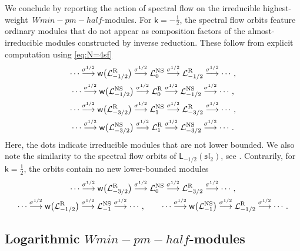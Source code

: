 \documentclass[10pt,a4paper]{amsart}
\numberwithin{equation}{section}
\newcommand{\kk}{\mathsf{k}} %
\newcommand{\NS}{\textnormal{NS}}
\newcommand{\R}{\textnormal{R}}
\DeclarePairedDelimiter{\brac}{\lparen}{\rparen} %
\newcommand{\lra}{\longrightarrow}
\newcommand{\alg}[1]{\mathfrak{#1}} %
\newcommand{\VOA}[1]{\mathsf{#1}} %
\newcommand{\Mod}[1]{\mathcal{#1}} %
\newcommand{\SLA}[2]{\alg{#1}_{#2}} %
\newcommand{\sltwo}{\SLA{sl}{2}}
\newcommand{\saff}[2]{\VOA{L}_{#1}(#2)} %
\newcommand{\ssl}[1][\kk]{\saff{#1}{\sltwo}} %
\newcommand{\swalg}[2]{\VOA{W}_{#1}^{\mathrm{#2}}} %
\newcommand{\smin}[1][\kk]{\swalg{#1}{min}} %
\newcommand{\sminpmhalf}{\smin[\pm 1/2]}
\newcommand{\nconjsymb}{\mathsf{w}} %
\newcommand{\nconj}{\nconjsymb \brac}
\newcommand{\nsfsymb}[1]{\sigma^{#1}} %
\newcommand{\nnsihw}[1]{\Mod{L}^{\NS}_{#1}} %
\newcommand{\nrihw}[1]{\Mod{L}^{\R}_{#1}}
\newcommand{\hw}{highest-weight}
\def\boldsymbol#1{#1}
\def\smash#1{#1}
\def\sminpmhalf{Wmin-pm-half}
\begin{document}
We conclude by reporting the action of spectral flow on the irreducible \hw\ \smash{$\sminpmhalf$}-modules.
For $\kk=-\frac{1}{2}$, the spectral flow orbits feature ordinary modules that do not appear as composition factors of the almost-irreducible modules constructed by inverse reduction.
These follow from explicit computation using \eqref{eq:N=4sf}
\begin{gather*}
\cdots \overset{\nsfsymb{1/2}}{\lra} \nconj[\big]{\nrihw{-1/2}} \overset{\nsfsymb{1/2}}{\lra} \nnsihw{0} \overset{\nsfsymb{1/2}}{\lra} \nrihw{-1/2} \overset{\nsfsymb{1/2}}{\lra} \cdots, \\
		\cdots \overset{\nsfsymb{1/2}}{\lra} \nconj[\big]{\nnsihw{-1/2}} \overset{\nsfsymb{1/2}}{\lra} \nrihw{0} \overset{\nsfsymb{1/2}}{\lra} \nnsihw{-1/2} \overset{\nsfsymb{1/2}}{\lra} \cdots, \\
		\cdots \overset{\nsfsymb{1/2}}{\lra} \nconj[\big]{\nrihw{-3/2}} \overset{\nsfsymb{1/2}}{\lra} \nnsihw{1} \overset{\nsfsymb{1/2}}{\lra} \nrihw{-3/2} \overset{\nsfsymb{1/2}}{\lra} \cdots, \\
		\cdots \overset{\nsfsymb{1/2}}{\lra} \nconj[\big]{\nnsihw{-3/2}} \overset{\nsfsymb{1/2}}{\lra} \nrihw{1} \overset{\nsfsymb{1/2}}{\lra} \nnsihw{-3/2} \overset{\nsfsymb{1/2}}{\lra} \cdots.
\end{gather*}
Here, the dots indicate irreducible modules that are not lower bounded.
We also note the similarity to the spectral flow orbits of $\ssl[-1/2]$, see \cite[Figure~3]{RidSL208}.
Contrarily, for $\kk=\frac{1}{2}$, the orbits contain no new lower-bounded modules
\begin{gather*}
		\cdots \overset{\nsfsymb{1/2}}{\lra} \nconj[\big]{\nrihw{-3/2}} \overset{\nsfsymb{1/2}}{\lra} \nnsihw{0} \overset{\nsfsymb{1/2}}{\lra} \nrihw{-3/2} \overset{\nsfsymb{1/2}}{\lra} \cdots, \\
		\cdots \overset{\nsfsymb{1/2}}{\lra} \nconj[\big]{\nrihw{-1/2}} \overset{\nsfsymb{1/2}}{\lra} \nnsihw{-1} \overset{\nsfsymb{1/2}}{\lra} \cdots, \qquad
		\cdots \overset{\nsfsymb{1/2}}{\lra} \nconj[\big]{\nnsihw{-1}} \overset{\nsfsymb{1/2}}{\lra} \nrihw{-1/2} \overset{\nsfsymb{1/2}}{\lra} \cdots.
	\end{gather*}

\subsection[Logarithmic sminpmhalf-modules]{Logarithmic \smash{$\boldsymbol{\sminpmhalf}$}-modules} \label{sec:k=+-1/2log}
\end{document}
